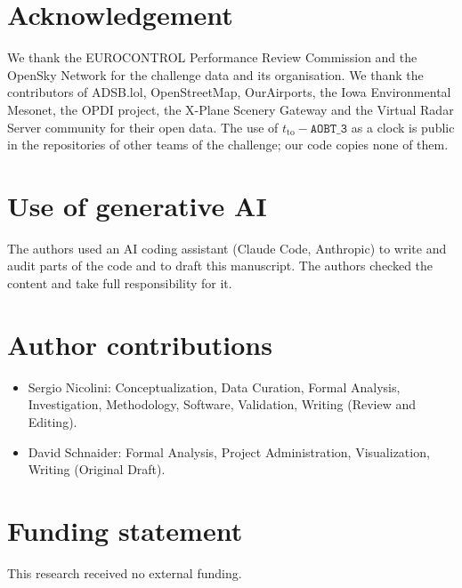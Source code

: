 \documentclass[
  manuscript=article,
  layout=preprint,
  year=2026,
  volume=x,
]{extra/joas}
\begin{document}
\section*{Acknowledgement}
We thank the EUROCONTROL Performance Review Commission and the OpenSky Network for the challenge data and its organisation. We thank the contributors of ADSB.lol, OpenStreetMap, OurAirports, the Iowa Environmental Mesonet, the OPDI project, the X-Plane Scenery Gateway and the Virtual Radar Server community for their open data. The use of $t_{\mathrm{to}} - \texttt{AOBT\_3}$ as a clock is public in the repositories of other teams of the challenge; our code copies none of them.

\section*{Use of generative AI}
The authors used an AI coding assistant (Claude Code, Anthropic) to write and audit parts of the code and to draft this manuscript. The authors checked the content and take full responsibility for it.

\section*{Author contributions}
\begin{itemize}
  \item Sergio Nicolini: Conceptualization, Data Curation, Formal Analysis, Investigation, Methodology, Software, Validation, Writing (Review and Editing).
  \item David Schnaider: Formal Analysis, Project Administration, Visualization, Writing (Original Draft).
\end{itemize}

\section*{Funding statement}
This research received no external funding.
\end{document}

